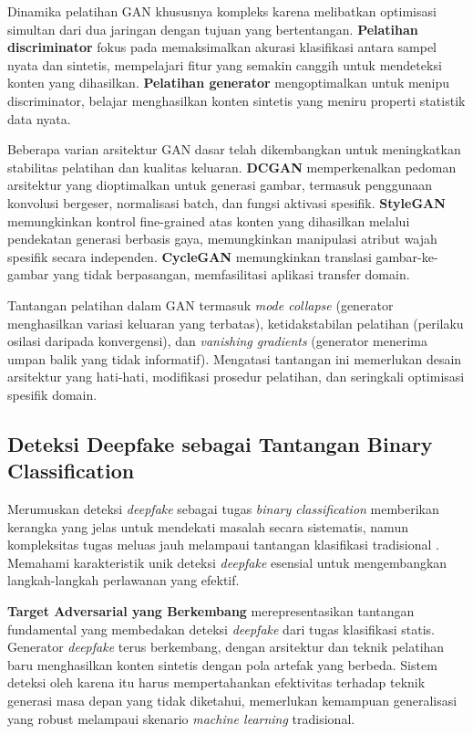Dinamika pelatihan GAN khususnya kompleks karena melibatkan optimisasi simultan dari dua jaringan dengan tujuan yang bertentangan. \textbf{Pelatihan discriminator} fokus pada memaksimalkan akurasi klasifikasi antara sampel nyata dan sintetis, mempelajari fitur yang semakin canggih untuk mendeteksi konten yang dihasilkan. \textbf{Pelatihan generator} mengoptimalkan untuk menipu discriminator, belajar menghasilkan konten sintetis yang meniru properti statistik data nyata.

Beberapa varian arsitektur GAN dasar telah dikembangkan untuk meningkatkan stabilitas pelatihan dan kualitas keluaran. \textbf{DCGAN} memperkenalkan pedoman arsitektur yang dioptimalkan untuk generasi gambar, termasuk penggunaan konvolusi bergeser, normalisasi batch, dan fungsi aktivasi spesifik. \textbf{StyleGAN} memungkinkan kontrol fine-grained atas konten yang dihasilkan melalui pendekatan generasi berbasis gaya, memungkinkan manipulasi atribut wajah spesifik secara independen. \textbf{CycleGAN} memungkinkan translasi gambar-ke-gambar yang tidak berpasangan, memfasilitasi aplikasi transfer domain.

Tantangan pelatihan dalam GAN termasuk \textit{mode collapse} (generator menghasilkan variasi keluaran yang terbatas), ketidakstabilan pelatihan (perilaku osilasi daripada konvergensi), dan \textit{vanishing gradients} (generator menerima umpan balik yang tidak informatif). Mengatasi tantangan ini memerlukan desain arsitektur yang hati-hati, modifikasi prosedur pelatihan, dan seringkali optimisasi spesifik domain.

\subsection{Deteksi Deepfake sebagai Tantangan Binary Classification}

Merumuskan deteksi \textit{deepfake} sebagai tugas \textit{binary classification} memberikan kerangka yang jelas untuk mendekati masalah secara sistematis, namun kompleksitas tugas meluas jauh melampaui tantangan klasifikasi tradisional \cite{verdoliva2020media}. Memahami karakteristik unik deteksi \textit{deepfake} esensial untuk mengembangkan langkah-langkah perlawanan yang efektif.

\textbf{Target Adversarial yang Berkembang} merepresentasikan tantangan fundamental yang membedakan deteksi \textit{deepfake} dari tugas klasifikasi statis. Generator \textit{deepfake} terus berkembang, dengan arsitektur dan teknik pelatihan baru menghasilkan konten sintetis dengan pola artefak yang berbeda. Sistem deteksi oleh karena itu harus mempertahankan efektivitas terhadap teknik generasi masa depan yang tidak diketahui, memerlukan kemampuan generalisasi yang robust melampaui skenario \textit{machine learning} tradisional.

